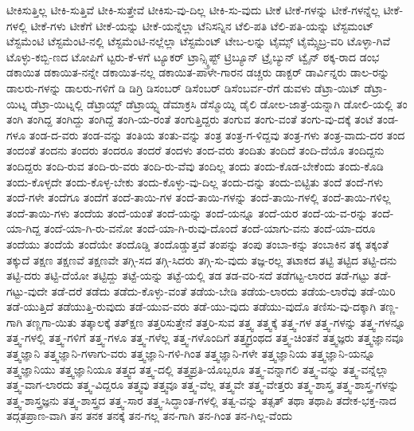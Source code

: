 {ಟೀಕಿಸುತ್ತಿಲ್ಲ
ಟೀಕಿ-ಸುತ್ತಿವೆ
ಟೀಕಿ-ಸುತ್ತೇವೆ
ಟೀಕಿಸು-ವು-ದಿಲ್ಲ
ಟೀಕಿ-ಸು-ವುದು
ಟೀಕೆ
ಟೀಕೆ-ಗಳನ್ನು
ಟೀಕೆ-ಗಳನ್ನೆಲ್ಲ
ಟೀಕೆ-ಗಳಲ್ಲಿ
ಟೀಕೆ-ಗಳು
ಟೀಕೆಗೆ
ಟೀಕೆ-ಯನ್ನು
ಟೀಕೆ-ಯನ್ನೆಲ್ಲಾ
ಟೆನಿಸನ್ನಿನ
ಟೆಲಿ-ಪತಿ
ಟೆಲಿ-ಪತಿ-ಯನ್ನು
ಟೆಸ್ಟಮಂಟ್
ಟೆಸ್ಟಮೆಂಟಿ
ಟೆಸ್ಟಮೆಂಟಿ-ನಲ್ಲಿ
ಟೆಸ್ಟಮೆಂಟಿ-ನಲ್ಲೆಲ್ಲಾ
ಟೆಸ್ಟಮೆಂಟ್
ಟೇಬ-ಲನ್ನು
ಟೈಮ್ಸ್
ಟೈಮ್ಸ್ಫೆಬ್ರ-ವರಿ
ಟೊಳ್ಳಾ-ಗಿವೆ
ಟೊಳ್ಳು-ಕಬ್ಬಿ-ಣದ
ಟೋಪಿಗೆ
ಟ್ಟರು-ಕೆ-ಳಗೆ
ಟ್ಯೂಕರ್
ಟ್ರಾನ್ಸ್ಕ್ರಿಪ್ಟ್
ಟ್ರಿಬ್ಯೂನ್
ಟ್ರೈಬ್ಯುನ್
ಟ್ವೈನ್
ಠಕ್ಕ-ರಾದ
ಡಂಭ
ಡಕಾಯಿತ
ಡಕಾಯಿತ-ನನ್ನೇ
ಡಕಾಯಿತ-ನಲ್ಲ
ಡಕಾಯಿತ-ಪಾಳೇ-ಗಾರನ
ಡಚ್ಚರು
ಡಾಕ್ಟರ್
ಡಾರ್ವಿನ್ನರು
ಡಾಲ-ರನ್ನು
ಡಾಲರು-ಗಳನ್ನು
ಡಾಲರು-ಗಳಿಗೆ
ಡಿ
ಡಿಗ್ರಿ
ಡಿಸಂಬರ್
ಡಿಸೆಂಬರ್
ಡಿಸೆಂಬರ್ವ-ರೆಗೆ
ಡುವಳು
ಡೆಟ್ರಾ-ಯಿಟ್
ಡೆಟ್ರಾ-ಯಿಟ್ನ
ಡೆಟ್ರಾ-ಯಿಟ್ನಲ್ಲಿ
ಡೆಟ್ರಾಯ್ಟ್
ಡೆಟ್ರಾಯ್ಟ್ನ
ಡೆಮಾಕ್ರಸಿ
ಡೆಸ್ಮೊಯ್ನಿ
ಡೈಲಿ
ಡೋಲ-ಜಾತ್ರೆ-ಯನ್ನಾಗಿ
ಡೋಲಿ-ಯಲ್ಲಿ
ತಂ
ತಂಗಿ
ತಂಗಿದ್ದ
ತಂಗಿದ್ದು
ತಂಗಿದ್ದೆ
ತಂಗಿ-ಯ-ರಂತೆ
ತಂಗುತ್ತಿದ್ದರು
ತಂಗುವ
ತಂಗು-ವಂತೆ
ತಂಗು-ವು-ದಕ್ಕೆ
ತಂಟೆ
ತಂಡ-ಗಳೂ
ತಂಡ-ದ-ವರು
ತಂಡ-ವನ್ನು
ತಂತಿಯ
ತಂತು-ವನ್ನು
ತಂತ್ರ
ತಂತ್ರ-ಗ-ಳಿದ್ದವು
ತಂತ್ರ-ಗಳು
ತಂತ್ರ-ವಾದು-ದರ
ತಂದ
ತಂದಂತೆ
ತಂದನು
ತಂದರು
ತಂದರೂ
ತಂದರೆ
ತಂದಳು
ತಂದ-ವರು
ತಂದಿತು
ತಂದಿದೆ
ತಂದಿ-ದೆಯೊ
ತಂದಿದ್ದನು
ತಂದಿದ್ದರು
ತಂದಿ-ರುವ
ತಂದಿ-ರು-ವರು
ತಂದಿ-ರು-ವೆವು
ತಂದಿಲ್ಲ
ತಂದು
ತಂದು-ಕೊಡ-ಬೇಕೆಂದು
ತಂದು-ಕೊಡಿ
ತಂದು-ಕೊಳ್ಳದೇ
ತಂದು-ಕೊಳ್ಳ-ಬೇಕು
ತಂದು-ಕೊಳ್ಳು-ವು-ದಿಲ್ಲ
ತಂದು-ದನ್ನು
ತಂದು-ಬಿಟ್ಟಿತು
ತಂದೆ
ತಂದೆ-ಗಳು
ತಂದೆ-ಗಳೇ
ತಂದೆಗೂ
ತಂದೆಗೆ
ತಂದೆ-ತಾಯಿ-ಗಳ
ತಂದೆ-ತಾಯಿ-ಗಳನ್ನು
ತಂದೆ-ತಾಯಿ-ಗಳಲ್ಲಿ
ತಂದೆ-ತಾಯಿ-ಗಳಿಲ್ಲ
ತಂದೆ-ತಾಯಿ-ಗಳು
ತಂದೆಯ
ತಂದೆ-ಯಂತೆ
ತಂದೆ-ಯನ್ನು
ತಂದೆ-ಯನ್ನೂ
ತಂದೆ-ಯರ
ತಂದೆ-ಯ-ವ-ರನ್ನು
ತಂದೆ-ಯಾ-ಗಿದ್ದ
ತಂದೆ-ಯಾ-ಗಿ-ರು-ವನೋ
ತಂದೆ-ಯಾ-ಗಿ-ರುವು-ದೊಂದೆ
ತಂದೆ-ಯಾಗು-ವನು
ತಂದೆ-ಯಾ-ದರೂ
ತಂದೆಯು
ತಂದೆಯೆ
ತಂದೆಯೇ
ತಂದೊಡ್ಡಿ
ತಂದೊಡ್ಡುತ್ತವೆ
ತಂಪನ್ನು
ತಂಪು
ತಂಬಾ-ಕನ್ನು
ತಂಬಾಕಿನ
ತಕ್ಕ
ತಕ್ಕಂತೆ
ತಕ್ಕುದೆ
ತಕ್ಷಣ
ತಕ್ಷಣವೆ
ತಕ್ಷಣವೇ
ತಗ್ಗಿ-ಸದ
ತಗ್ಗಿ-ಸಿದರು
ತಗ್ಗಿ-ಸು-ವುದು
ತಜ್ಞ-ರಲ್ಲ
ತಟಾಕದ
ತಟ್ಟಿ
ತಟ್ಟಿದ
ತಟ್ಟಿ-ದನು
ತಟ್ಟಿ-ದರು
ತಟ್ಟಿ-ದೆಯೋ
ತಟ್ಟಿದ್ದು
ತಟ್ಟೆ-ಯನ್ನು
ತಟ್ಟೆ-ಯಲ್ಲಿ
ತಡ
ತಡ-ವರಿ-ಸದೆ
ತಡೆಗಟ್ಟ-ಲಾರದ
ತಡೆ-ಗಟ್ಟು
ತಡೆ-ಗಟ್ಟು-ವುದೇ
ತಡೆ-ದರೆ
ತಡೆದು
ತಡೆದು-ಕೊಳ್ಳು-ವಂತೆ
ತಡೆಯ-ಬೇಡಿ
ತಡೆಯ-ಲಾರದು
ತಡೆಯ-ಲಾರೆವು
ತಡೆ-ಯಿರಿ
ತಡೆ-ಯುತ್ತಿದೆ
ತಡೆಯುತ್ತಿ-ರುವುದು
ತಡೆ-ಯುವ-ವರು
ತಡೆ-ಯು-ವುದು
ತಡೆಯು-ವುದೊ
ತಣಿಸು-ವು-ದಕ್ಕಾಗಿ
ತಣ್ಣ-ಗಾಗಿ
ತಣ್ಣಗಾ-ಯಿತು
ತತ್ಕಾಲಕ್ಕೆ
ತತ್ಕ್ಷಣ
ತತ್ತರಿಸುತ್ತೇನೆ
ತತ್ತರಿ-ಸುವ
ತತ್ತ್ವ
ತತ್ತ್ವಕ್ಕೆ
ತತ್ತ್ವ-ಗಳ
ತತ್ತ್ವ-ಗಳನ್ನು
ತತ್ತ್ವ-ಗಳನ್ನೂ
ತತ್ತ್ವ-ಗಳಲ್ಲಿ
ತತ್ತ್ವ-ಗಳಿಗೆ
ತತ್ತ್ವ-ಗಳೂ
ತತ್ತ್ವ-ಗಳೆಲ್ಲ
ತತ್ತ್ವ-ಗಳೊಂದಿಗೆ
ತತ್ತ್ವಗ್ರಂಥದ
ತತ್ತ್ವ-ಚಿಂತನೆ
ತತ್ತ್ವಜ್ಞರು
ತತ್ತ್ವಜ್ಞಾನವೂ
ತತ್ತ್ವಜ್ಞಾನಿ
ತತ್ತ್ವಜ್ಞಾನಿ-ಗಳಾಗು-ವರು
ತತ್ತ್ವಜ್ಞಾನಿ-ಗಳಿ-ಗಿಂತ
ತತ್ತ್ವಜ್ಞಾನಿ-ಗಳೇ
ತತ್ತ್ವಜ್ಞಾನಿಯ
ತತ್ತ್ವಜ್ಞಾನಿ-ಯನ್ನೂ
ತತ್ತ್ವಜ್ಞಾನಿಯು
ತತ್ತ್ವಜ್ಞಾನಿಯೂ
ತತ್ತ್ವದ
ತತ್ತ್ವ-ದಲ್ಲಿ
ತತ್ತ್ವಪ್ರತಿ-ಯೊಬ್ಬರೂ
ತತ್ತ್ವ-ವನ್ನಾಗಲಿ
ತತ್ತ್ವ-ವನ್ನು
ತತ್ತ್ವ-ವನ್ನೆಲ್ಲಾ
ತತ್ತ್ವ-ವಾಗ-ಲಾರದು
ತತ್ತ್ವ-ವಿದ್ದರೂ
ತತ್ತ್ವವು
ತತ್ತ್ವವೂ
ತತ್ತ್ವ-ವೆಲ್ಲ
ತತ್ತ್ವವೇ
ತತ್ತ್ವ-ವೇತ್ತರು
ತತ್ತ್ವ-ಶಾಸ್ತ್ರ
ತತ್ತ್ವ-ಶಾಸ್ತ್ರ-ಗಳನ್ನು
ತತ್ತ್ವ-ಶಾಸ್ತ್ರಜ್ಞನು
ತತ್ತ್ವ-ಶಾಸ್ತ್ರದ
ತತ್ತ್ವ-ಸಾರ
ತತ್ತ್ವ-ಸಿದ್ಧಾಂತ-ಗಳಲ್ಲಿ
ತತ್ವ-ವನ್ನು
ತತ್ಸತ್
ತಥಾ
ತಥಾಪಿ
ತದೇಕ-ಭಕ್ತ-ನಾದ
ತದ್ಗತಪ್ರಾಣ-ವಾಗಿ
ತನ
ತನಕ
ತನಕ್ಕೆ
ತನ-ಗಲ್ಲ
ತನ-ಗಾಗಿ
ತನ-ಗಿಂತ
ತನ-ಗಿಲ್ಲ-ವೆಂದು
}

